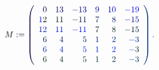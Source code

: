 \documentclass[12pt]{article}
\begin{document}
\makeatletter
\renewcommand*{\@textcolor}[3]{%
  \protect\leavevmode
  \begingroup
    \color#1{#2}#3%
  \endgroup
}
\makeatother
\begin{displaymath}
\mathcolor[RGB]{0,0,15}{M} \mathcolor[RGB]{0,0,30}{:} \mathcolor[RGB]{0,0,45}{=} \mathcolor[RGB]{0,0,60}{\left(} \begin{array} {rrrrrr} { \mathcolor[RGB]{0,0,75}{0} } & { \mathcolor[RGB]{0,0,90}{1} \mathcolor[RGB]{0,0,105}{3} } & { \mathcolor[RGB]{0,0,120}{-} \mathcolor[RGB]{0,0,135}{1} \mathcolor[RGB]{0,0,150}{3} } & { \mathcolor[RGB]{0,0,165}{9} } & { \mathcolor[RGB]{0,0,180}{1} \mathcolor[RGB]{0,0,195}{0} } & { \mathcolor[RGB]{0,0,210}{-} \mathcolor[RGB]{0,0,225}{1} \mathcolor[RGB]{0,0,240}{9} } \\ { \mathcolor[RGB]{0,0,255}{1} \mathcolor[RGB]{0,15,0}{2} } & { \mathcolor[RGB]{0,15,15}{1} \mathcolor[RGB]{0,15,30}{1} } & { \mathcolor[RGB]{0,15,45}{-} \mathcolor[RGB]{0,15,60}{1} \mathcolor[RGB]{0,15,75}{1} } & { \mathcolor[RGB]{0,15,90}{7} } & { \mathcolor[RGB]{0,15,105}{8} } & { \mathcolor[RGB]{0,15,120}{-} \mathcolor[RGB]{0,15,135}{1} \mathcolor[RGB]{0,15,150}{5} } \\ { \mathcolor[RGB]{0,15,165}{1} \mathcolor[RGB]{0,15,180}{2} } & { \mathcolor[RGB]{0,15,195}{1} \mathcolor[RGB]{0,15,210}{1} } & { \mathcolor[RGB]{0,15,225}{-} \mathcolor[RGB]{0,15,240}{1} \mathcolor[RGB]{0,15,255}{1} } & { \mathcolor[RGB]{0,30,0}{7} } & { \mathcolor[RGB]{0,30,15}{8} } & { \mathcolor[RGB]{0,30,30}{-} \mathcolor[RGB]{0,30,45}{1} \mathcolor[RGB]{0,30,60}{5} } \\ { \mathcolor[RGB]{0,30,75}{6} } & { \mathcolor[RGB]{0,30,90}{4} } & { \mathcolor[RGB]{0,30,105}{5} } & { \mathcolor[RGB]{0,30,120}{1} } & { \mathcolor[RGB]{0,30,135}{2} } & { \mathcolor[RGB]{0,30,150}{-} \mathcolor[RGB]{0,30,165}{3} } \\ { \mathcolor[RGB]{0,30,180}{6} } & { \mathcolor[RGB]{0,30,195}{4} } & { \mathcolor[RGB]{0,30,210}{5} } & { \mathcolor[RGB]{0,30,225}{1} } & { \mathcolor[RGB]{0,30,240}{2} } & { \mathcolor[RGB]{0,30,255}{-} \mathcolor[RGB]{0,45,0}{3} } \\ { \mathcolor[RGB]{0,45,15}{6} } & { \mathcolor[RGB]{0,45,30}{4} } & { \mathcolor[RGB]{0,45,45}{5} } & { \mathcolor[RGB]{0,45,60}{1} } & { \mathcolor[RGB]{0,45,75}{2} } & { \mathcolor[RGB]{0,45,90}{-} \mathcolor[RGB]{0,45,105}{3} } \end{array} \mathcolor[RGB]{0,45,120}{\right)} \mathcolor[RGB]{0,45,135}{.}
\end{displaymath}
\end{document}
